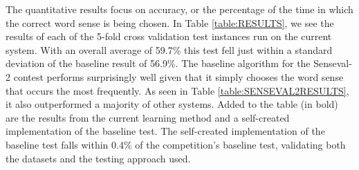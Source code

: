 The quantitative results focus on accuracy, or the percentage of the time in which
the correct word sense is being chosen.
In Table \ref{table:RESULTS}, we see the results of each of the 5-fold cross
validation test instances run on the current system.  With an overall average of
59.7\% this test fell just within a standard deviation of the baseline result of
56.9\%. The baseline algorithm for the Senseval-2 contest performs surprisingly
well given that it simply chooses the word sense that occurs the most frequently.
As seen in Table \ref{table:SENSEVAL2RESULTS}, it also outperformed a
majority of other systems. Added to the table (in bold) are the results from the
current learning method and a self-created implementation of the baseline test.
The self-created implementation of the baseline test falls within 0.4\% of the
competition's baseline test, validating both the datasets and the testing
approach used.

